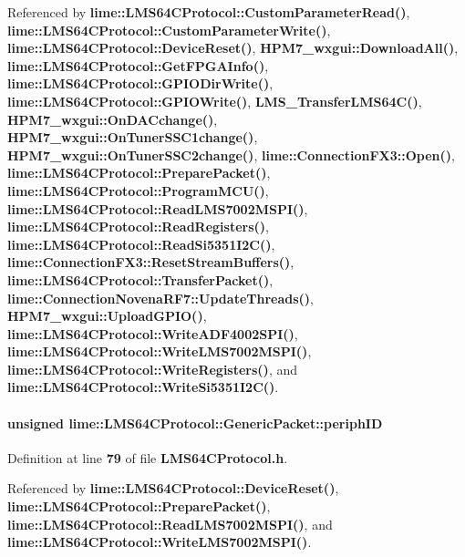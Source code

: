 Referenced by {\bf lime\+::\+L\+M\+S64\+C\+Protocol\+::\+Custom\+Parameter\+Read()}, {\bf lime\+::\+L\+M\+S64\+C\+Protocol\+::\+Custom\+Parameter\+Write()}, {\bf lime\+::\+L\+M\+S64\+C\+Protocol\+::\+Device\+Reset()}, {\bf H\+P\+M7\+\_\+wxgui\+::\+Download\+All()}, {\bf lime\+::\+L\+M\+S64\+C\+Protocol\+::\+Get\+F\+P\+G\+A\+Info()}, {\bf lime\+::\+L\+M\+S64\+C\+Protocol\+::\+G\+P\+I\+O\+Dir\+Write()}, {\bf lime\+::\+L\+M\+S64\+C\+Protocol\+::\+G\+P\+I\+O\+Write()}, {\bf L\+M\+S\+\_\+\+Transfer\+L\+M\+S64\+C()}, {\bf H\+P\+M7\+\_\+wxgui\+::\+On\+D\+A\+Cchange()}, {\bf H\+P\+M7\+\_\+wxgui\+::\+On\+Tuner\+S\+S\+C1change()}, {\bf H\+P\+M7\+\_\+wxgui\+::\+On\+Tuner\+S\+S\+C2change()}, {\bf lime\+::\+Connection\+F\+X3\+::\+Open()}, {\bf lime\+::\+L\+M\+S64\+C\+Protocol\+::\+Prepare\+Packet()}, {\bf lime\+::\+L\+M\+S64\+C\+Protocol\+::\+Program\+M\+C\+U()}, {\bf lime\+::\+L\+M\+S64\+C\+Protocol\+::\+Read\+L\+M\+S7002\+M\+S\+P\+I()}, {\bf lime\+::\+L\+M\+S64\+C\+Protocol\+::\+Read\+Registers()}, {\bf lime\+::\+L\+M\+S64\+C\+Protocol\+::\+Read\+Si5351\+I2\+C()}, {\bf lime\+::\+Connection\+F\+X3\+::\+Reset\+Stream\+Buffers()}, {\bf lime\+::\+L\+M\+S64\+C\+Protocol\+::\+Transfer\+Packet()}, {\bf lime\+::\+Connection\+Novena\+R\+F7\+::\+Update\+Threads()}, {\bf H\+P\+M7\+\_\+wxgui\+::\+Upload\+G\+P\+I\+O()}, {\bf lime\+::\+L\+M\+S64\+C\+Protocol\+::\+Write\+A\+D\+F4002\+S\+P\+I()}, {\bf lime\+::\+L\+M\+S64\+C\+Protocol\+::\+Write\+L\+M\+S7002\+M\+S\+P\+I()}, {\bf lime\+::\+L\+M\+S64\+C\+Protocol\+::\+Write\+Registers()}, and {\bf lime\+::\+L\+M\+S64\+C\+Protocol\+::\+Write\+Si5351\+I2\+C()}.

\paragraph[{periph\+ID}]{\setlength{\rightskip}{0pt plus 5cm}unsigned lime\+::\+L\+M\+S64\+C\+Protocol\+::\+Generic\+Packet\+::periph\+ID}\label{structlime_1_1LMS64CProtocol_1_1GenericPacket_a419c5cb8c02aab417408539ad21685fa}


Definition at line {\bf 79} of file {\bf L\+M\+S64\+C\+Protocol.\+h}.



Referenced by {\bf lime\+::\+L\+M\+S64\+C\+Protocol\+::\+Device\+Reset()}, {\bf lime\+::\+L\+M\+S64\+C\+Protocol\+::\+Prepare\+Packet()}, {\bf lime\+::\+L\+M\+S64\+C\+Protocol\+::\+Read\+L\+M\+S7002\+M\+S\+P\+I()}, and {\bf lime\+::\+L\+M\+S64\+C\+Protocol\+::\+Write\+L\+M\+S7002\+M\+S\+P\+I()}.

